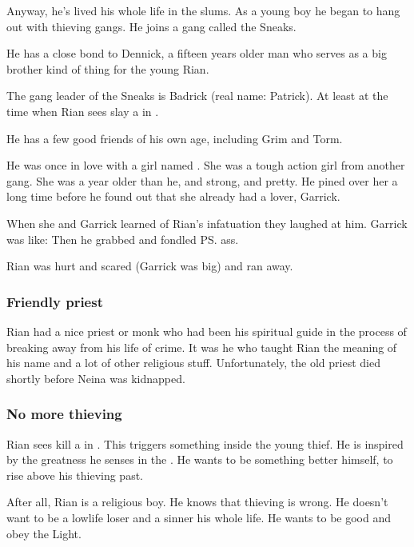 Anyway, he's lived his whole life in the slums. 
As a young boy he began to hang out with thieving gangs. 
He joins a gang called the Sneaks. 

He has a close bond to Dennick, a fifteen years older man who serves as a big brother kind of thing for the young Rian. 

The gang leader of the Sneaks is Badrick (real name: Patrick). 
At least at the time when Rian sees {\Ishnaruchaefir} slay a \ghobal{} in \Malcur. 

He has a few good friends of his own age, including Grim and Torm. 

He was once in love with a girl named \Mya. 
She was a tough action girl from another gang. 
She was a year older than he, and strong, and pretty. 
He pined over her a long time before he found out that she already had a lover, Garrick. 

When she and Garrick learned of Rian's infatuation they laughed at him. 
Garrick was like: 
Then he grabbed and fondled \ps{\Mya} ass. 

Rian was hurt and scared (Garrick was big) and ran away. 





\subsubsection{Friendly priest}
Rian had a nice priest or monk who had been his spiritual guide in the process of breaking away from his life of crime. 
It was he who taught Rian the meaning of his name and a lot of other religious stuff. 
Unfortunately, the old priest died shortly before Neina was kidnapped. 





\subsubsection{No more thieving}
Rian sees \QuessanthIshnaruchaefir{} kill a \ghobal{} in \Malcur. 
This triggers something inside the young thief. 
He is inspired by the greatness he senses in the \draconic{} \vertex. 
He wants to be something better himself, to rise above his thieving past. 

After all, Rian is a religious boy. 
He knows that thieving is wrong. 
He doesn't want to be a lowlife loser and a sinner his whole life. 
He wants to be good and obey the Light. 

